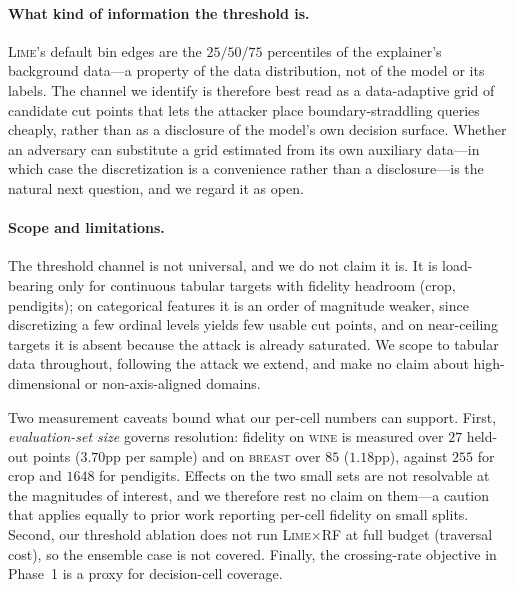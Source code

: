 \documentclass[sigconf,anonymous,review]{acmart}
\begin{document}
\paragraph{What kind of information the threshold is.} \textsc{Lime}'s default bin edges are the
$25/50/75$ percentiles of the explainer's background data---a property of the data distribution, not
of the model or its labels. The channel we identify is therefore best read as a data-adaptive grid of
candidate cut points that lets the attacker place boundary-straddling queries cheaply, rather than as
a disclosure of the model's own decision surface. Whether an adversary can substitute a grid estimated
from its own auxiliary data---in which case the discretization is a convenience rather than a
disclosure---is the natural next question, and we regard it as open.

\paragraph{Scope and limitations.} The threshold channel is not universal, and we do not claim it is.
It is load-bearing only for continuous tabular targets with fidelity headroom (crop, pendigits); on
categorical features it is an order of magnitude weaker, since discretizing a few ordinal levels
yields few usable cut points, and on near-ceiling targets it is absent because the attack is already
saturated. We scope to tabular data throughout, following the attack we extend, and make no
claim about high-dimensional or non-axis-aligned domains.

Two measurement caveats bound what our per-cell numbers can support. First, \emph{evaluation-set size}
governs resolution: fidelity on \textsc{wine} is measured over $27$ held-out points ($3.70$pp per
sample) and on \textsc{breast} over $85$ ($1.18$pp), against $255$ for crop and $1648$ for pendigits.
Effects on the two small sets are not resolvable at the magnitudes of interest, and we therefore rest
no claim on them---a caution that applies equally to prior work reporting per-cell fidelity on small
splits. Second, our threshold ablation does not run \textsc{Lime}$\times$RF at full budget (traversal
cost), so the ensemble case is not covered. Finally, the crossing-rate objective in Phase~1 is a proxy
for decision-cell coverage.
\end{document}
